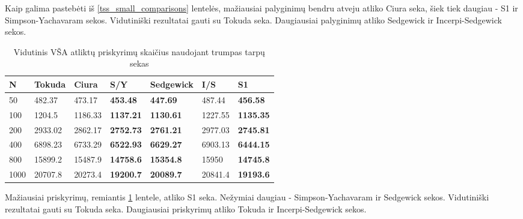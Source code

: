 \documentclass{VUMIFInfKursinis}
\begin{document}
Kaip galima pastebėti iš \ref{tss_small_comparisons} lentelės, mažiausiai palyginimų bendru atveju atliko Ciura seka,
šiek tiek daugiau - S1 ir Simpson-Yachavaram sekos.
Vidutiniški rezultatai gauti su Tokuda seka.
Daugiausiai palyginimų atliko Sedgewick ir Incerpi-Sedgewick sekos.

\begin{table}[H]
  \caption{Vidutinis VŠA atliktų priskyrimų skaičius naudojant trumpas tarpų sekas}
  \label{tss_small_assignments}
  \begin{tabular}{|l|l|l|l|l|l|l|}
  \hline
  N    & Tokuda  & Ciura   & S/Y              & Sedgewick        & I/S     & S1               \\ \hline
  50   & 482.37  & 473.17  & \textbf{453.48}  & \textbf{447.69}  & 487.44  & \textbf{456.58}  \\ \hline
  100  & 1204.5  & 1186.33 & \textbf{1137.21} & \textbf{1130.61} & 1227.55 & \textbf{1135.35} \\ \hline
  200  & 2933.02 & 2862.17 & \textbf{2752.73} & \textbf{2761.21} & 2977.03 & \textbf{2745.81} \\ \hline
  400  & 6898.23 & 6733.29 & \textbf{6522.93} & \textbf{6629.27} & 6903.13 & \textbf{6444.15} \\ \hline
  800  & 15899.2 & 15487.9 & \textbf{14758.6} & \textbf{15354.8} & 15950   & \textbf{14745.8} \\ \hline
  1000 & 20707.8 & 20273.4 & \textbf{19200.7} & \textbf{20089.7} & 20841.4 & \textbf{19193.6} \\ \hline
  \end{tabular}
\end{table}

Mažiausiai priskyrimų, remiantis \ref{tss_small_assignments} lentele, atliko S1 seka.
Nežymiai daugiau - Simpson-Yachavaram ir Sedgewick sekos.
Vidutiniški rezultatai gauti su Tokuda seka.
Daugiausiai priskyrimų atliko Tokuda ir Incerpi-Sedgewick sekos.
\end{document}
